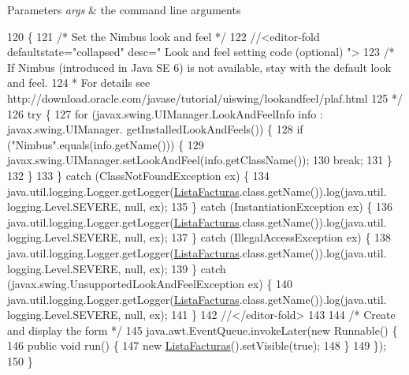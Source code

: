 \begin{DoxyParams}{Parameters}
{\em args} & the command line arguments \\
\hline
\end{DoxyParams}

\begin{DoxyCode}
120                                            \{
121         \textcolor{comment}{/* Set the Nimbus look and feel */}
122         \textcolor{comment}{//<editor-fold defaultstate="collapsed" desc=" Look and feel setting code (optional) ">}
123         \textcolor{comment}{/* If Nimbus (introduced in Java SE 6) is not available, stay with the default look and feel.}
124 \textcolor{comment}{         * For details see http://download.oracle.com/javase/tutorial/uiswing/lookandfeel/plaf.html }
125 \textcolor{comment}{         */}
126         \textcolor{keywordflow}{try} \{
127             \textcolor{keywordflow}{for} (javax.swing.UIManager.LookAndFeelInfo info : javax.swing.UIManager.
      getInstalledLookAndFeels()) \{
128                 \textcolor{keywordflow}{if} (\textcolor{stringliteral}{"Nimbus"}.equals(info.getName())) \{
129                     javax.swing.UIManager.setLookAndFeel(info.getClassName());
130                     \textcolor{keywordflow}{break};
131                 \}
132             \}
133         \} \textcolor{keywordflow}{catch} (ClassNotFoundException ex) \{
134             java.util.logging.Logger.getLogger(\mbox{\hyperlink{class_interfaz_package_1_1_lista_facturas_a1e539cb0cbfd907b97944bdc34987938}{ListaFacturas}}.class.getName()).log(java.util.
      logging.Level.SEVERE, null, ex);
135         \} \textcolor{keywordflow}{catch} (InstantiationException ex) \{
136             java.util.logging.Logger.getLogger(\mbox{\hyperlink{class_interfaz_package_1_1_lista_facturas_a1e539cb0cbfd907b97944bdc34987938}{ListaFacturas}}.class.getName()).log(java.util.
      logging.Level.SEVERE, null, ex);
137         \} \textcolor{keywordflow}{catch} (IllegalAccessException ex) \{
138             java.util.logging.Logger.getLogger(\mbox{\hyperlink{class_interfaz_package_1_1_lista_facturas_a1e539cb0cbfd907b97944bdc34987938}{ListaFacturas}}.class.getName()).log(java.util.
      logging.Level.SEVERE, null, ex);
139         \} \textcolor{keywordflow}{catch} (javax.swing.UnsupportedLookAndFeelException ex) \{
140             java.util.logging.Logger.getLogger(\mbox{\hyperlink{class_interfaz_package_1_1_lista_facturas_a1e539cb0cbfd907b97944bdc34987938}{ListaFacturas}}.class.getName()).log(java.util.
      logging.Level.SEVERE, null, ex);
141         \}
142         \textcolor{comment}{//</editor-fold>}
143 
144         \textcolor{comment}{/* Create and display the form */}
145         java.awt.EventQueue.invokeLater(\textcolor{keyword}{new} Runnable() \{
146             \textcolor{keyword}{public} \textcolor{keywordtype}{void} run() \{
147                 \textcolor{keyword}{new} \mbox{\hyperlink{class_interfaz_package_1_1_lista_facturas_a1e539cb0cbfd907b97944bdc34987938}{ListaFacturas}}().setVisible(\textcolor{keyword}{true});
148             \}
149         \});
150     \}
\end{DoxyCode}


